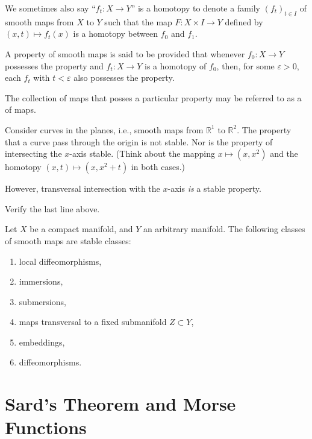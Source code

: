 We sometimes also say ``$f_{t} : X \to Y$'' is a homotopy to denote a family $(f_{t})_{t \in I}$ of smooth maps from $X$ to $Y$ such that the map $F : X \times I \to Y$ defined by $(x, t) \mapsto f_{t}(x)$ is a homotopy between $f_{0}$ and $f_{1}$.

\begin{defn}
	A property of smooth maps is said to be  provided that whenever $f_{0} : X \to Y$ possesses the property and $f_{t} : X \to Y$ is a homotopy of $f_{0}$, then, for some $\varepsilon > 0$, each $f_{t}$ with $t < \varepsilon$ also possesses the property.

	The collection of maps that posses a particular property may be referred to as a  of maps. 
\end{defn}

\begin{ex}
	Consider curves in the planes, i.e., smooth maps from $\mathbb{R}^{1}$ to $\mathbb{R}^{2}$. The property that a curve pass through the origin is not stable. Nor is the property of intersecting the $x$-axis stable. (Think about the mapping $x \mapsto (x, x^{2})$ and the homotopy $(x, t) \mapsto (x, x^{2} + t)$ in both cases.)

	However, transversal intersection with the $x$-axis \emph{is} a stable property.
\end{ex}

\begin{exe}
	Verify the last line above.
\end{exe}

\begin{thm}
	Let $X$ be a compact manifold, and $Y$ an arbitrary manifold. The following classes of smooth maps are stable classes:
	\begin{enumerate}
		\item local diffeomorphisms,
		\item immersions,
		\item submersions,
		\item maps transversal to a fixed submanifold $Z \subset Y$,
		\item embeddings,
		\item diffeomorphisms.
	\end{enumerate}
\end{thm}

\section{Sard's Theorem and Morse Functions}

